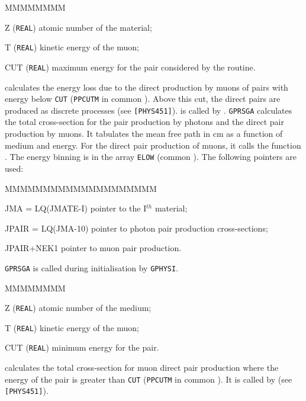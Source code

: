 \begin{DLtt}{MMMMMMMM}
\item[Z] ({\tt REAL}) atomic number of the material;
\item[T] ({\tt REAL}) kinetic energy of the muon;
\item[CUT] ({\tt REAL}) maximum energy for the pair considered by the routine.
\end{DLtt}
 calculates the energy loss due to the direct
production by muons of \Pem\Pep pairs with energy below {\tt CUT}
({\tt PPCUTM} in common ).
Above this cut, the direct pairs are produced as discrete processes
(see {\tt [PHYS451]}).  is called by .
{\tt GPRSGA} calculates the total cross-section for 
the pair production by photons and the direct pair production by muons.
It tabulates the mean free path
in cm as a function of medium and energy. 
For the direct pair production of muons, it calls 
the function . The energy
binning is in the array {\tt ELOW} (common ).
The following pointers are used:
\begin{DLtt}{MMMMMMMMMMMMMMMMMMMM}
\item[JMA = LQ(JMATE-I)]  pointer to the I$^{th}$ material;
\item[JPAIR = LQ(JMA-10)] pointer to photon pair production cross-sections;
\item[JPAIR+NEK1]      pointer to muon pair production.
\end{DLtt}
{\tt GPRSGA} is called during initialisation by {\tt GPHYSI}.


\begin{DLtt}{MMMMMMMM}
\item[Z] ({\tt REAL}) atomic number of the medium;
\item[T] ({\tt REAL}) kinetic energy of the muon;
\item[CUT] ({\tt REAL}) minimum energy for the \Pem\Pep pair.
\end{DLtt}
 calculates the total cross-section for
muon direct pair production where the energy of the pair is greater
than {\tt CUT} ({\tt PPCUTM} in common ). It is called 
by  (see {\tt [PHYS451]}).

